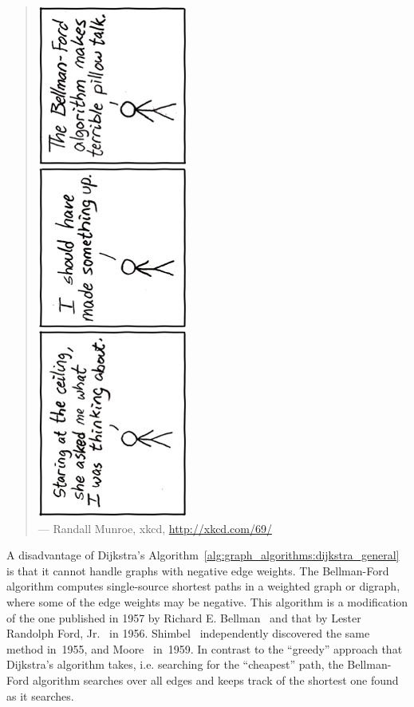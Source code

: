 \begin{quote}
\footnotesize
\includegraphics[scale=2.5]{image/graph-algorithms/pillow-talk-bellman-ford} \\
\noindent
--- Randall Munroe, xkcd,
\url{http://xkcd.com/69/}
\end{quote}

\noindent
A disadvantage of Dijkstra's
Algorithm~\ref{alg:graph_algorithms:dijkstra_general} is that it
cannot handle graphs with negative edge
weights. The
Bellman-Ford algorithm computes
single-source shortest paths in a
weighted graph or digraph, where some of the edge weights may be
negative. This algorithm is a modification of
the one published in 1957 by Richard E.
Bellman~\cite{Bellman1957} and that by
Lester Randolph Ford,
Jr.~\cite{Ford1956} in
1956. Shimbel~\cite{Shimbel1955} independently
discovered the same method in~1955, and
Moore~\cite{Moore1959} in~1959. In contrast to
the ``greedy'' approach that Dijkstra's
algorithm takes, i.e. searching for the
``cheapest'' path, the Bellman-Ford
algorithm searches over all edges and
keeps track of the shortest one found as it searches.

